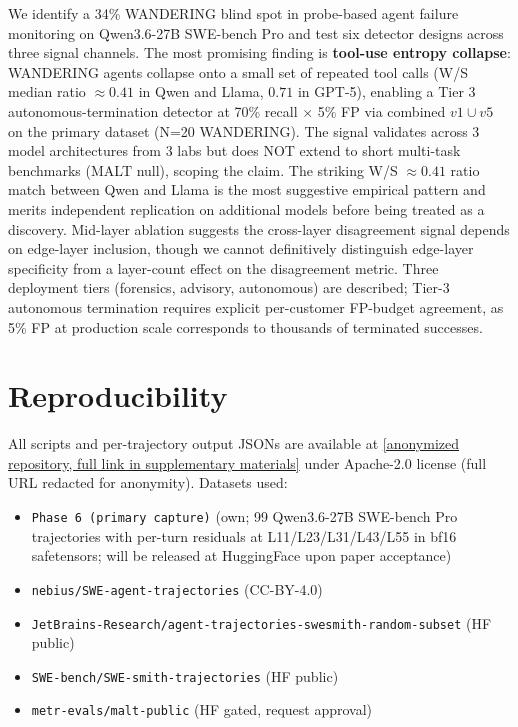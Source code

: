 \documentclass[11pt]{article}
\begin{document}
We identify a 34\% WANDERING blind spot in probe-based agent failure monitoring on Qwen3.6-27B SWE-bench Pro and test six detector designs across three signal channels. The most promising finding is \textbf{tool-use entropy collapse}: WANDERING agents collapse onto a small set of repeated tool calls (W/S median ratio $\approx 0.41$ in Qwen and Llama, $0.71$ in GPT-5), enabling a Tier 3 autonomous-termination detector at 70\% recall $\times$ 5\% FP via combined $v1 \cup v5$ on the primary dataset (N=20 WANDERING). The signal validates across 3 model architectures from 3 labs but does NOT extend to short multi-task benchmarks (MALT null), scoping the claim. The striking W/S $\approx 0.41$ ratio match between Qwen and Llama is the most suggestive empirical pattern and merits independent replication on additional models before being treated as a discovery. Mid-layer ablation suggests the cross-layer disagreement signal depends on edge-layer inclusion, though we cannot definitively distinguish edge-layer specificity from a layer-count effect on the disagreement metric. Three deployment tiers (forensics, advisory, autonomous) are described; Tier-3 autonomous termination requires explicit per-customer FP-budget agreement, as 5\% FP at production scale corresponds to thousands of terminated successes.

\section*{Reproducibility}

All scripts and per-trajectory output JSONs are available at \url{[anonymized repository, full link in supplementary materials]} under Apache-2.0 license (full URL redacted for anonymity). Datasets used:
\begin{itemize}
\item \texttt{Phase 6 (primary capture)} (own; 99 Qwen3.6-27B SWE-bench Pro trajectories with per-turn residuals at L11/L23/L31/L43/L55 in bf16 safetensors; will be released at HuggingFace upon paper acceptance)
\item \texttt{nebius/SWE-agent-trajectories} (CC-BY-4.0)
\item \texttt{JetBrains-Research/}\allowbreak\texttt{agent-trajectories-swesmith-random-subset} (HF public)
\item \texttt{SWE-bench/SWE-smith-trajectories} (HF public)
\item \texttt{metr-evals/malt-public} (HF gated, request approval)
\end{itemize}
\end{document}
